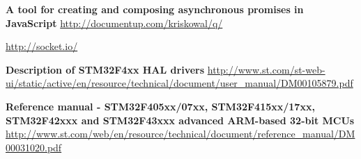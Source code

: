 \documentclass[oneside,12pt,a4paper,draft]{book} %
\begin{document}
\begin{thebibliography}{99}
 {\bf A tool for creating and composing asynchronous promises in JavaScript} \url{http://documentup.com/kriskowal/q/}

 \url{http://socket.io/}

 {\bf Description of STM32F4xx HAL drivers} \url{http://www.st.com/st-web-ui/static/active/en/resource/technical/document/user_manual/DM00105879.pdf}

 {\bf Reference manual - STM32F405xx/07xx, STM32F415xx/17xx, STM32F42xxx and
STM32F43xxx advanced ARM\textregistered-based 32-bit MCUs} \url{http://www.st.com/web/en/resource/technical/document/reference_manual/DM00031020.pdf}
\end{thebibliography}
\end{document}
